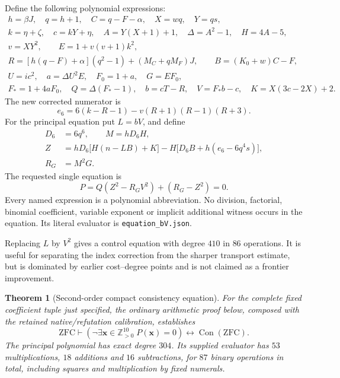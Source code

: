 \documentclass[11pt,letterpaper]{article}
\newtheorem{theorem}{Theorem}[section]
\theoremstyle{definition}
\theoremstyle{remark}
\begin{document}
Define the following polynomial expressions:
\begin{gather*}
 h=\beta J,\quad q=h+1,\quad C=q-F-\alpha,\quad X=wq,\quad Y=qs,\\
 k=\eta+\zeta,\quad c=kY+\eta,\quad
 A=Y(X+1)+1,\quad \Delta=A^2-1,\quad H=4A-5,\\
 v=XY^2,\qquad E=1+v(v+1)k^2,\\
 R=[h(q-F)+\alpha](q^2-1)+(M_C+qM_F)J,\qquad
 B=(K_0+w)C-F,\\
 U=ic^2,\quad a=\Delta U^2E,\quad F_0=1+a,\quad G=EF_0,\\
 F_*=1+4aF_0,\quad Q=\Delta(F_*-1),\quad
 b=cT-R,\quad V=F_*b-c,\quad K=X(3c-2X)+2.
\end{gather*}
The new corrected numerator is
\begin{equation}
 e_6=6(k-R-1)-v(R+1)(R-1)(R+3).
 \label{eq:lucas-e6}
\end{equation}
For the principal equation put $L=bV$, and define
\begin{align*}
 D_6&=6q^6,\qquad M=hD_6H,\\
 Z&=hD_6\bigl[H(n-LB)+K\bigr]
       -H\bigl[D_6B+h(e_6-6q^4s)\bigr],\\
 R_G&=M^2G.
\end{align*}
The requested single equation is
\begin{equation}
 \boxed{\;P=Q(Z^2-R_GV^2)+(R_G-Z^2)=0.\;}
 \label{eq:lucas-principal}
\end{equation}
Every named expression is a polynomial abbreviation.  No division, factorial,
binomial coefficient, variable exponent or implicit additional witness occurs
in the equation.  Its literal evaluator is \texttt{equation\_bV.json}.

Replacing $L$ by $V^2$ gives a control equation with degree $410$ in $86$
operations.  It is useful for separating the index correction from the sharper
transport estimate, but is dominated by earlier cost--degree points and is
not claimed as a frontier improvement.

\begin{theorem}[Second-order compact consistency equation]
\label{thm:lucas-q1}
For the complete fixed coefficient tuple just specified, the ordinary
arithmetic proof below, composed with the retained native/refutation
calibration, establishes
\[
 \mathrm{ZFC}\vdash
 \left(\neg\exists\mathbf x\in\mathbb Z_{>0}^{10}\;
 P(\mathbf x)=0\right)\longleftrightarrow\operatorname{Con}(\mathrm{ZFC}).
\]
The principal polynomial has exact degree $304$.  Its supplied evaluator has
$53$ multiplications, $18$ additions and $16$ subtractions, for $87$ binary
operations in total, including squares and multiplication by fixed numerals.
\end{theorem}
\end{document}
